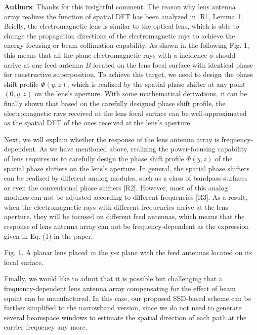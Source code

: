 \documentclass[a4paper,12pt]{article}
\begin{document}
{\color{blue} \textbf{Authors}: Thanks for this insightful comment. The reason why lens antenna array realizes the function of spatial DFT has been analyzed in [R1, Lemma 1]. Briefly, the electromagnetic lens is similar to the optical lens, which is able to change the propagation directions of the electromagnetic rays to achieve the energy focusing or beam collimation capability. As shown in the following Fig. 1, this means that all the plane electromagnetic rays with a incidence ${\phi }$ should arrive at one feed antenna ${B}$ located on the lens focal surface with identical phase for constructive superposition. To achieve this target, we need to design the phase shift profile ${\Phi \left( {y,z} \right)}$, which is realized by the spatial phase shifter at any point ${\left( {0,y,z} \right)}$ on the lens's aperture. With some mathematical derivations, it can be finally shown that based on the carefully designed phase shift profile, the electromagnetic rays received at the lens focal surface can be well-approximated as the spatial DFT of the ones received at the lens's aperture.

Next, we will explain whether the response of the lens antenna array is frequency-dependent. As we have mentioned above, realizing the power-focusing capability of lens requires us to carefully design the phase shift profile ${\Phi \left( {y,z} \right)}$ of the spatial phase shifters on the lens's aperture. In general, the spatial phase shifters can be realized by different analog modules, such as a class of bandpass surfaces or even the conventional phase shifters [R2]. However, most of this analog modules can not be  adjusted according to different frequencies [R3]. As a result, when the electromagnetic rays with different frequencies arrive at the lens aperture, they will be focused on different feed antennas, which means that the response of lens antenna array can not be frequency-dependent as the expression given in Eq. (1) in the paper.



Fig. 1. A planar lens placed in the y-z plane with the feed antennas located on its focal surface.

Finally, we would like to admit that it is possible but challenging that a frequency-dependent lens antenna array compensating for the effect of beam squint can be manufactured. In this case, our proposed SSD-based scheme can be further simplified to the narrowband version, since we do not need to generate several beamspace windows to estimate the spatial direction of each path at the carrier frequency any more.

}
\end{document}
